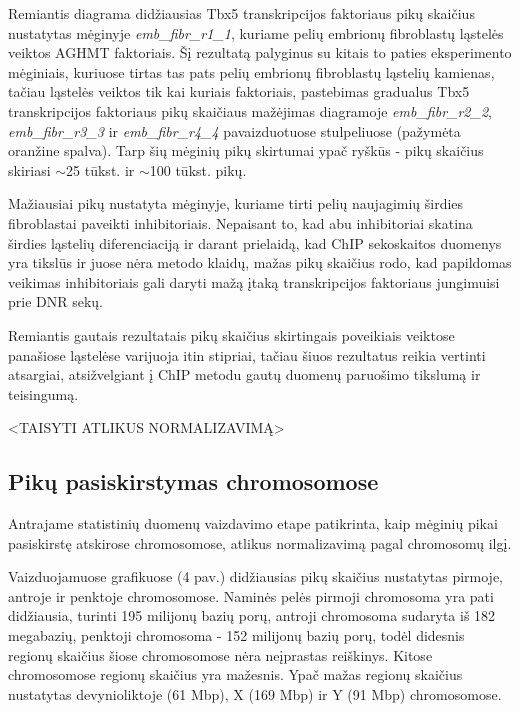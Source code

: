 \documentclass[12pt]{article}
\begin{document}
Remiantis diagrama didžiausias Tbx5 transkripcijos faktoriaus pikų skaičius
nustatytas mėginyje \small\emph{emb\_fibr\_r1\_1}, kuriame pelių embrionų
fibroblastų ląstelės veiktos AGHMT faktoriais.
Šį rezultatą palyginus su kitais to paties eksperimento mėginiais, kuriuose
tirtas tas pats pelių embrionų fibroblastų ląstelių kamienas, tačiau ląstelės
veiktos tik kai kuriais faktoriais, pastebimas gradualus Tbx5 transkripcijos
faktoriaus pikų skaičiaus mažėjimas diagramoje
\small\emph{emb\_fibr\_r2\_2}, \small\emph{emb\_fibr\_r3\_3} ir
\small\emph{emb\_fibr\_r4\_4} pavaizduotuose stulpeliuose (pažymėta
oranžine spalva). Tarp šių mėginių pikų skirtumai ypač ryškūs - pikų
skaičius skiriasi \(\sim\)25 tūkst. ir \(\sim\)100 tūkst. pikų.

Mažiausiai pikų nustatyta mėginyje, kuriame tirti pelių naujagimių širdies
fibroblastai paveikti inhibitoriais. Nepaisant to, kad abu inhibitoriai
skatina širdies ląstelių diferenciaciją\cite{HEART_CELL_DIFF_ARTCL} ir darant
prielaidą, kad ChIP sekoskaitos duomenys yra tikslūs ir juose nėra
metodo klaidų, mažas pikų skaičius rodo, kad papildomas veikimas inhibitoriais
gali daryti mažą įtaką transkripcijos faktoriaus jungimuisi prie DNR sekų.

Remiantis gautais rezultatais pikų skaičius skirtingais poveikiais veiktose
panašiose ląstelėse varijuoja itin stipriai, tačiau šiuos rezultatus reikia
vertinti atsargiai, atsižvelgiant į ChIP metodu gautų duomenų paruošimo
tikslumą ir teisingumą.

<TAISYTI ATLIKUS NORMALIZAVIMĄ>
\subsection{Pikų pasiskirstymas chromosomose}
Antrajame statistinių duomenų vaizdavimo etape patikrinta, kaip mėginių pikai
pasiskirstę atskirose chromosomose, atlikus normalizavimą pagal chromosomų ilgį.

Vaizduojamuose grafikuose (4 pav.) didžiausias pikų skaičius nustatytas
pirmoje, antroje ir penktoje chromosomose. Naminės pelės pirmoji chromosoma yra
pati didžiausia, turinti 195 milijonų bazių porų, antroji chromosoma sudaryta
iš 182 megabazių, penktoji chromosoma - 152 milijonų bazių porų, todėl didesnis
regionų skaičius šiose chromosomose nėra neįprastas reiškinys. Kitose
chromosomose regionų skaičius yra mažesnis. Ypač mažas regionų skaičius
nustatytas devynioliktoje (61 Mbp), X (169 Mbp) ir Y (91 Mbp) chromosomose.
\end{document}
